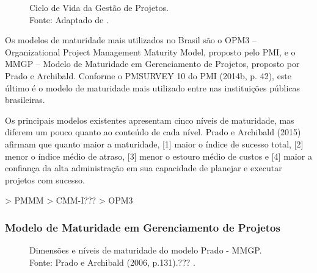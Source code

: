   \begin{figure}[ht]
    \centering
    \caption{Ciclo de Vida da Gestão de Projetos.\\ Fonte: Adaptado de \cite{kerzner2006projeto}.}
    \label{ciclo-maturidade}
  \end{figure}

Os modelos de maturidade mais utilizados no Brasil são o OPM3 – Organizational Project Management Maturity Model, proposto pelo PMI, e o MMGP – Modelo de Maturidade em Gerenciamento de Projetos, proposto por Prado e Archibald. Conforme o PMSURVEY 10 do PMI (2014b, p. 42), este último é o modelo de maturidade mais utilizado entre nas instituições públicas brasileiras.

Os principais modelos existentes apresentam cinco níveis de maturidade, mas diferem um pouco quanto ao conteúdo de cada nível.
Prado e Archibald (2015) afirmam que quanto maior a maturidade, [1] maior o índice de sucesso total, [2] menor o índice médio de atraso, [3] menor o estouro médio de custos e [4] maior a confiança da alta administração em sua capacidade de planejar e executar projetos com sucesso.


> PMMM
> CMM-I???
> OPM3
  \subsubsection{Modelo de Maturidade em Gerenciamento de Projetos}

    \begin{figure}[ht]
      \centering
      \caption{Dimensões e níveis de maturidade do modelo Prado - MMGP.\\ Fonte: Prado e Archibald (2006, p.131).??? \cite{kerzner2006projeto}.}
      \label{mmgp}
    \end{figure}

